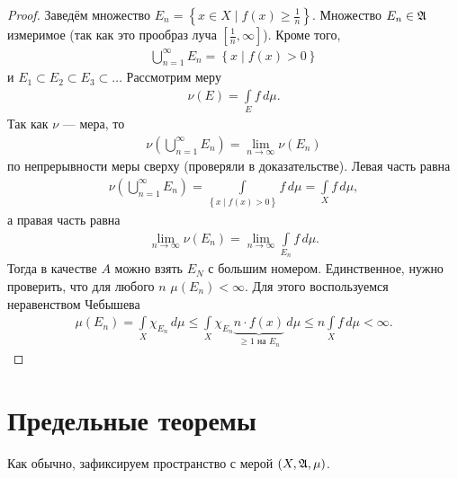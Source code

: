 \begin{proof}
 Заведём множество $E_n = \left\{ x \in X \mid f(x) \geqslant \frac{1}{n} \right\}$. Множество $E_n \in \mathfrak{A}$ измеримое (так как это прообраз луча $\left[\frac{1}{n}, \infty\right]$). Кроме того, \begin{align*}
  \bigcup_{n=1}^{\infty} E_n = \left\{ x \mid f(x) > 0 \right\}
 \end{align*} и $ E_1 \subset E_2 \subset E_3 \subset \ldots$ Рассмотрим меру 
\begin{align*}
\nu(E) = \int\limits_{E} f \, d\mu  
.\end{align*} Так как $\nu$ --- мера, то \begin{align*}
 \nu \left( \bigcup_{n=1}^{\infty} E_n \right) = \lim_{n \to \infty} \nu(E_n) 
\end{align*} по непрерывности меры сверху (проверяли в доказательстве). Левая часть равна \begin{align*}
 \nu \left( \bigcup_{n=1}^{\infty} E_n \right) = \int\limits_{\left\{ x \mid f(x) > 0 \right\}} f \, d\mu  = \int\limits_{X} f \, d\mu  
,\end{align*} а правая часть равна \begin{align*}
 \lim_{n \to \infty} \nu(E_n)  = \lim_{n \to \infty} \int\limits_{E_n} f \, d\mu  
.\end{align*} Тогда в качестве $A$ можно взять $E_N$ с большим номером. Единственное, нужно проверить, что для любого $n$ $\mu(E_n) < \infty$. Для этого воспользуемся неравенством Чебышева \begin{align*}
\mu(E_n) = \int\limits_{X} \chi_{E_n} \, d\mu  \leqslant \int\limits_{X} \chi_{E_n} \underbrace{n \cdot f(x)}_{\geqslant 1 \text{ на $E_n$}} \, d\mu  \leqslant n \int\limits_{X} f \, d\mu  < \infty
.\end{align*}
\end{proof}

\section{Предельные теоремы}
Как обычно, зафиксируем пространство с мерой $(X, \mathfrak{A}, \mu)$.

